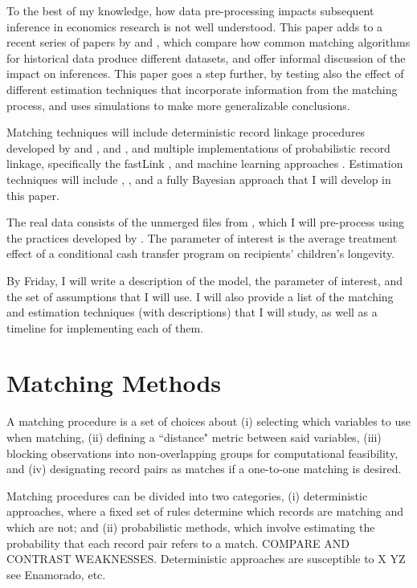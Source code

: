 \documentclass[12pt]{article}
\begin{document}
To the best of my knowledge, how data pre-processing impacts subsequent inference in economics research is not well understood.  This paper adds to a recent series of papers by  \cite{bailey2017} and \cite{arp2018, abe2019}, which compare how common matching algorithms for historical data produce different datasets, and offer informal discussion of the impact on inferences.  This paper goes a step further, by testing also the effect of different estimation techniques that incorporate information from the matching process, and uses simulations to make more generalizable conclusions.  

Matching techniques will include deterministic record linkage procedures developed by \cite{ferrie96} and \cite{abe2012, abe2014, abe2017}, and \cite{aizer2016}, and multiple implementations of probabilistic record linkage, specifically the fastLink \cite{enamorado2019}, and machine learning approaches \cite{Feigenbaum2016AML}. Estimation techniques will include \cite{ahl2019}, \cite{lahiri05}, and a fully Bayesian approach that I will develop in this paper. 

The real data consists of the unmerged files from \cite{aizer2016}, which I will pre-process using the practices developed by \cite{arp2018}.  The parameter of interest is the average treatment effect of a conditional cash transfer program on recipients' children's longevity.   

By Friday, I will write a description of the model, the parameter of interest, and the set of assumptions that I will use.   I will also provide a list of the matching and estimation techniques (with descriptions) that I will study, as well as a timeline for implementing each of them. 
 

\newpage
\section{Matching Methods}

A matching procedure is a set of choices about (i) selecting which variables to use when matching, (ii) defining a ``distance" metric between said variables, (iii) blocking observations into non-overlapping groups for computational feasibility, and (iv) designating record pairs as matches if a one-to-one matching is desired.    

Matching procedures can be divided into two categories, (i) deterministic approaches, where a fixed set of rules determine which records are matching and which are not; and (ii) probabilistic methods, which involve estimating the probability that each record pair refers to a match.  COMPARE AND CONTRAST WEAKNESSES.   Deterministic approaches are susceptible to X YZ  see Enamorado, etc. 
\end{document}
